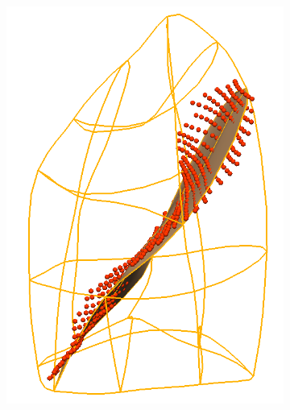 {\begin{figure}[htbp]
\begin{subfigure}{.35\linewidth}
  \includegraphics[width=\linewidth,trim={{.0\wd0} {.0\wd0} {.0\wd0} {.0\wd0}},clip]{Segmentation/Image/ProjectedLeftFissureMesh.png}
  \caption{}
  \label{fig:PCAFissurePrediction-a} 
\end{subfigure}
\begin{subfigure}{.37\linewidth}%

\end{subfigure}
\end{figure}}
